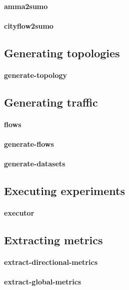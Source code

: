 \paragraph{amma2sumo}
\paragraph{cityflow2sumo}

\subsection{Generating topologies}

\paragraph{generate-topology}

\subsection{Generating traffic}

\paragraph{flows}
\paragraph{generate-flows}
\paragraph{generate-datasets}

\subsection{Executing experiments}

\paragraph{executor}

\subsection{Extracting metrics}

\paragraph{extract-directional-metrics}
\paragraph{extract-global-metrics}

